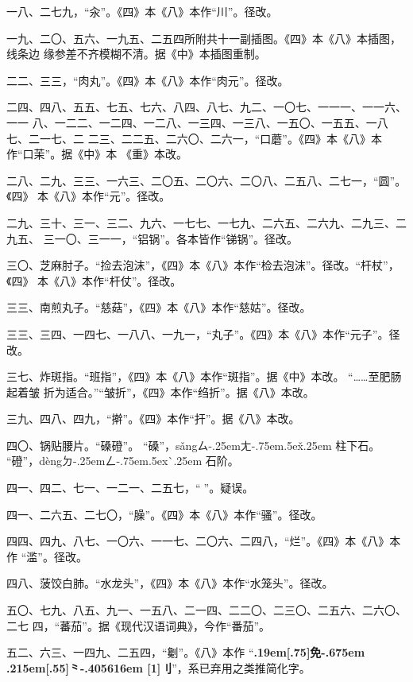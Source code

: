\begin{list}{}
一八、二七九，“汆”。《四》本《八》本作“川”。径改。

一九、二〇、五六、一九五、二五四所附共十一副插图。《四》本《八》本插图，线条边
缘参差不齐模糊不清。据《中》本插图重制。

二二、三三，“肉丸”。《四》本《八》本作“肉元”。径改。

二四、四八、五五、七五、七六、八四、八七、九二、一〇七、一一一、一一六、一一
八、一二二、一二四、一二八、一三四、一三八、一五〇、一五五、一八七、二一七、二
二三、二二五、二六〇、二六一，“口蘑”。《四》本《八》本作“口茉”。据《中》本
《重》本改。

二八、二九、三三、一六三、二〇五、二〇六、二〇八、二五八、二七一，“圆”。《四》
本《八》本作“元”。径改。

二九、三十、三一、三二、九六、一七七、一七九、二六五、二六九、二九三、二九五、
三一〇、三一一，“铝锅”。各本皆作“锑锅”。径改。

三〇、芝麻肘子。“捡去泡沫”，《四》本《八》本作“检去泡沫”。径改。“杆杖”，《四》
本《八》本作“杆仗”。径改。

三三、南煎丸子。“慈菇”，《四》本《八》本作“慈姑”。径改。

三三、三四、一四七、一八八、一九一，“丸子”。《四》本《八》本作“元子”。径改。

三七、炸斑指。“班指”，《四》本《八》本作“斑指”。据《中》本改。 “……至肥肠起着皱
折为适合。”“皱折”，《四》本作“绉折”。据《八》本改。

三九、四八、四九，“擀”。《四》本作“扞”。据《八》本改。

四〇、锅贴腰片。“磉磴”。
“磉”，{s\v{a}ng}{ㄙ\kern-.25emㄤ\kern-.75em\raise.5ex\hbox{\v{}}\kern.25em}
柱下石。
“磴”，{d\`{e}ng}{ㄉ\kern-.25emㄥ\kern-.75em\raise.5ex\hbox{\`{}}\kern.25em}
石阶。

四一、四二、七一、一二一、二五七，“𠟤”。疑误。

四一、二六五、二七〇，“臊”。《四》本《八》本作“骚”。径改。

四四、四九、八七、一〇六、一一七、二〇六、二四八，“烂”。《四》本《八》本作
“滥”。径改。

四八、菠饺白肺。“水龙头”，《四》本《八》本作“水笼头”。径改。

五〇、七九、八五、九一、一五八、二一四、二二〇、二三〇、二五六、二六〇、二七
四，“蕃茄”。据《现代汉语词典》，今作“番茄”。

五二、六三、一四九、二五四，“劖”。《八》本作
“{\bfseries\raise.19em\hbox{\scalebox{.675}[.75]{免}}\kern-.675em%
\lower.215em\hbox{\scalebox{.95}[.55]{⺀}}\kern-.405616em%
\scalebox{.65}[1]{刂}}”，系已弃用之类推简化字。


\end{list}
